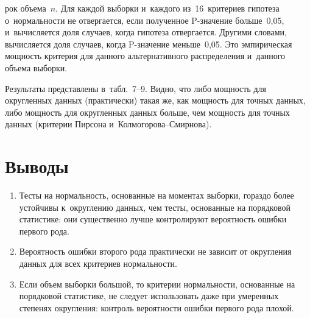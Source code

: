 \begin{multicols}{2}


\noindent
рок объема~$n$. Для
каждой выборки и~каждого из~16~критериев гипотеза о~нормальности не отвергается, если полученное P-зна\-че\-ние
больше~0,05, и~вычисляется доля случаев, когда гипотеза отвергается. Другими словами, вычисляется доля случаев,
когда P-зна\-че\-ние меньше~0,05. Это эмпирическая мощ\-ность критерия для данного альтернативного распределения 
и~данного объема выборки. 

Результаты представлены в~табл.~7--9.
Видно, что либо мощ\-ность для округленных данных (практически) такая же, как мощность для точных данных, либо
мощность для округленных данных больше, чем мощность для точных данных (критерии Пирсона и~Кол\-мо\-го\-ро\-ва--Смир\-нова).


\section{Выводы}


\noindent
\begin{enumerate}[1.]
\item  Тесты на нормальность, основанные на моментах выборки, гораздо более устойчивы к~округлению данных, чем
тесты, основанные на порядковой статистике: они существенно \mbox{лучше} контролируют вероятность ошибки первого
\mbox{рода}.

\item Вероятность ошибки второго рода практически не зависит от округления данных для всех критериев нормальности.

\item Если объем выборки большой, то критерии нормальности, основанные на порядковой статистике, не следует
использовать даже при умеренных степенях округления: контроль вероятности ошибки первого рода плохой.
\end{enumerate}


\end{multicols}
